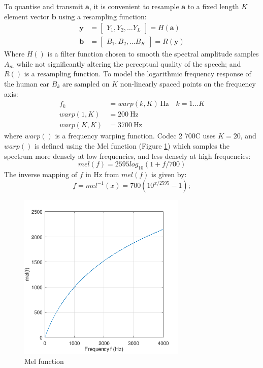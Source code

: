 \documentclass{article}
\begin{document}
To quantise and transmit $\mathbf{a}$, it is convenient to resample $\mathbf{a}$ to a fixed length $K$ element vector $\mathbf{b}$ using a resampling function:
\begin{equation}
\begin{split}
\mathbf{y} &= \begin{bmatrix} Y_1, Y_2, \ldots Y_L \end{bmatrix} = H(\mathbf{a}) \\
\mathbf{b} &= \begin{bmatrix} B_1, B_2, \ldots B_K \end{bmatrix} = R(\mathbf{y})
\end{split}
\end{equation}
Where $H()$ is a filter function chosen to smooth the spectral amplitude samples $A_m$ while not significantly altering the perceptual quality of the speech; and $R()$ is a resampling function. To model the logarithmic frequency response of the human ear $B_k$  are sampled on $K$ non-linearly spaced points on the frequency axis:
\begin{equation}
\begin{split}
f_k &= warp(k,K) \ \textrm{Hz} \quad k=1 \ldots K \\
warp(1,K) &= 200 \ \textrm{Hz} \\
warp(K,K) &= 3700 \ \textrm{Hz}
\end{split}
\end{equation}
where $warp()$ is a frequency warping function. Codec 2 700C uses $K=20$, and $warp()$ is defined using the Mel function (Figure \ref{fig:mel_fhz}) which samples the spectrum more densely at low frequencies, and less densely at high frequencies:
\begin{equation} \label{eq:mel_f}
mel(f) = 2595log_{10}(1+f/700)
\end{equation}
The inverse mapping of $f$ in Hz from $mel(f)$ is given by:
\begin{equation} \label{eq:f_mel}
f = mel^{-1}(x) = 700(10^{x/2595} - 1);
\end{equation}

\begin{figure}[h]
\caption{Mel function}
\label{fig:mel_fhz}
\begin{center}
\includegraphics[width=8cm]{ratek_mel_fhz}
\end{center}
\end{figure}
\end{document}
